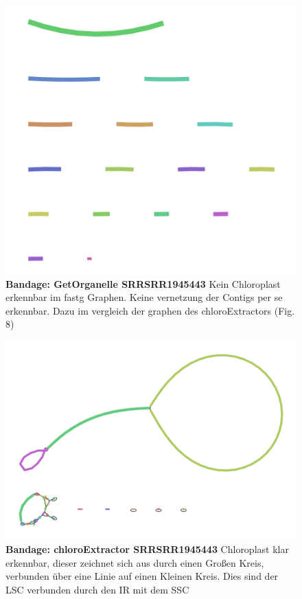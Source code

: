 \documentclass{scrartcl}
\begin{document}
\begin{figure}
\includegraphics[width=.9\linewidth]{./graph_GO_SRR1945443.png}
\caption[Bandage: GetOrganelle SRRSRR1945443]{\textbf{Bandage: GetOrganelle SRRSRR1945443} Kein Chloroplast erkennbar im fastg Graphen. Keine vernetzung der Contigs per se erkennbar. Dazu im vergleich der graphen des chloroExtractors (Fig. 8)}
\end{figure}
\begin{figure}
\includegraphics[width=.9\linewidth]{./graph_CE_SRR1945443.png}
\caption[Bandage: chloroExtractor SRRSRR1945443]{\textbf{Bandage: chloroExtractor SRRSRR1945443} Chloroplast klar erkennbar, dieser zeichnet sich aus durch einen Großen Kreis, verbunden über eine Linie auf einen Kleinen Kreis. Dies sind der LSC verbunden durch den IR mit dem SSC}
\end{figure}
\end{document}
